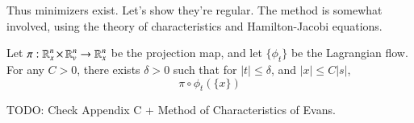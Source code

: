 Thus minimizers exist. Let's show they're regular. The method is somewhat involved, using the theory of characteristics and Hamilton-Jacobi equations.

\begin{lemma}
    Let $\pi: \operatorname{\mathbb{R}}^n_x \times \operatorname{\mathbb{R}}^n_v \to \operatorname{\mathbb{R}}^n_x$ be the projection map, and let $\{ \phi_t \}$ be the Lagrangian flow. For any $C > 0$, there exists $\delta > 0$ such that for $|t| \leq \delta$, and $|x| \leq C |s|$,
    \[  \]
    \[ \pi \circ \phi_t( \{ x \} ) \]
\end{lemma}






TODO: Check Appendix C + Method of Characteristics of Evans.




